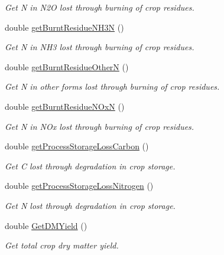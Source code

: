 \begin{DoxyCompactItemize}
\begin{DoxyCompactList}\small\item\em Get N in N2O lost through burning of crop residues. \end{DoxyCompactList}\item 
double \mbox{\hyperlink{class_crop_sequence_class_abd4a4514e94f542705fa48565901094b}{get\+Burnt\+Residue\+N\+H3N}} ()
\begin{DoxyCompactList}\small\item\em Get N in N\+H3 lost through burning of crop residues. \end{DoxyCompactList}\item 
double \mbox{\hyperlink{class_crop_sequence_class_ac1b7b6083a9f81c2c459697b5522f827}{get\+Burnt\+Residue\+OtherN}} ()
\begin{DoxyCompactList}\small\item\em Get N in other forms lost through burning of crop residues. \end{DoxyCompactList}\item 
double \mbox{\hyperlink{class_crop_sequence_class_aa4fef8f3d81d98b8e5e6a0a18e67ff8b}{get\+Burnt\+Residue\+N\+OxN}} ()
\begin{DoxyCompactList}\small\item\em Get N in N\+Ox lost through burning of crop residues. \end{DoxyCompactList}\item 
double \mbox{\hyperlink{class_crop_sequence_class_a45d976adcb6e2e1d27255f2207c40eb9}{get\+Process\+Storage\+Loss\+Carbon}} ()
\begin{DoxyCompactList}\small\item\em Get C lost through degradation in crop storage. \end{DoxyCompactList}\item 
double \mbox{\hyperlink{class_crop_sequence_class_a760f4ab08221d163e5dc1350306d09b7}{get\+Process\+Storage\+Loss\+Nitrogen}} ()
\begin{DoxyCompactList}\small\item\em Get N lost through degradation in crop storage. \end{DoxyCompactList}\item 
double \mbox{\hyperlink{class_crop_sequence_class_a0e8e7c933602b0e5ba2da6782206ad95}{Get\+D\+M\+Yield}} ()
\begin{DoxyCompactList}\small\item\em Get total crop dry matter yield. \end{DoxyCompactList}\item 

\end{DoxyCompactItemize}
